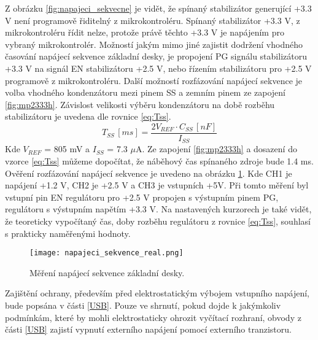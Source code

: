 	\par Z obrázku \ref{fig:napajeci_sekvecne} je vidět, že spínaný stabilizátor generující +3.3 V není programově řiditelný z mikrokontroléru. Spínaný stabilizátor +3.3 V, z mikrokontroléru řídit nelze, protože právě těchto +3.3 V je napájením pro vybraný mikrokontrolér. Možností jakým mimo jiné zajistit dodržení vhodného časování napájecí sekvence základní desky, je propojení PG signálu stabilizátoru +3.3 V na signál EN stabilizátoru +2.5 V, nebo řízením stabilizátoru pro +2.5 V programově z mikrokontroléru. Další možností rozfázování napájecí sekvence je volba vhodného kondenzátoru mezi pinem SS a zemním pinem ze zapojení \ref{fig:mp2333h}. Závislost velikosti výběru kondenzátoru na době rozběhu stabilizátoru je uvedena dle rovnice \ref{eq:Tss}.
	\begin{equation}
		T_{SS}\,[ms] = \frac{2V_{REF} \cdot C_{SS} \,[nF]}{I_{SS}}
		\label{eq:Tss}
	\end{equation}
	Kde $V_{REF}$ = 805 mV a $I_{SS}$ = 7.3 $\mu$A. Ze zapojení \ref{fig:mp2333h} a dosazení do vzorce \ref{eq:Tss} můžeme dopočítat, že náběhový čas spínaného zdroje bude 1.4 ms. Ověření rozfázování napájecí sekvence je uvedeno na obrázku \ref{fig:napajeci_sekvecne_real}. Kde CH1 je napájení +1.2 V, CH2 je +2.5 V a CH3 je vstupních +5V. Při tomto měření byl vstupní pin EN regulátoru pro +2.5 V propojen s výstupním pinem PG, regulátoru s výstupním napětím +3.3 V. Na nastavených kurzorech je také vidět, že teoreticky vypočítaný čas, doby rozběhu regulátoru z rovnice \ref{eq:Tss}, souhlasí s prakticky naměřenými hodnoty. 
	\begin{figure}[h!]
		\centering
		\captionsetup{justification=centering}
		\texttt{[image: napajeci\_sekvence\_real.png]}
		\caption{Měření napájecí sekvence základní desky.} 
		\label{fig:napajeci_sekvecne_real}
	\end{figure}
	\par Zajištění ochrany, především před elektrostatickým výbojem vstupního napájení, bude popsána v části \ref{USB}. Pouze ve shrnutí, pokud dojde k jakýmkoliv podmínkám, které by mohli elektrostaticky ohrozit vyčítací rozhraní, obvody z části \ref{USB} zajistí vypnutí externího napájení pomocí externího tranzistoru. 

